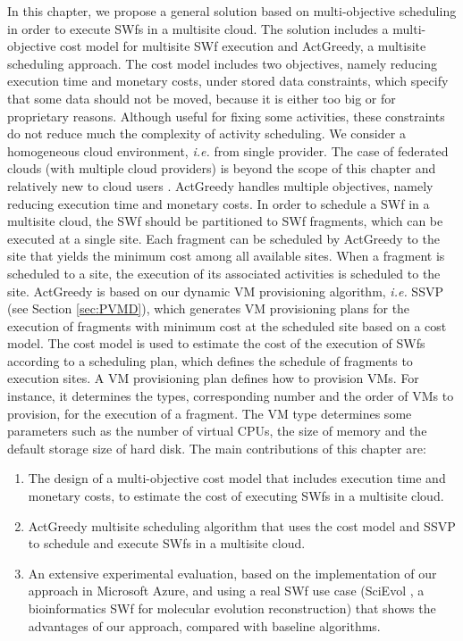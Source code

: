 In this chapter, we propose a general solution based on multi-objective scheduling in order to execute SWfs in a multisite cloud. The solution includes a multi-objective cost model for multisite SWf execution and ActGreedy, a multisite scheduling approach. 
The cost model includes two objectives, namely reducing execution time and monetary costs, under stored data constraints, which specify that some data should not be moved, because it is either too big or for proprietary reasons.
Although useful for fixing some activities, these constraints do not reduce much the complexity of activity scheduling.
We consider a homogeneous cloud environment, \textit{i.e.} from single provider. The case of federated clouds (with multiple cloud providers) is beyond the scope of this chapter and relatively new to cloud users \cite{Toosi2014}.
ActGreedy handles multiple objectives, namely reducing execution time and monetary costs. 
In order to schedule a SWf in a multisite cloud, the SWf should be partitioned to SWf fragments, which can be executed at a single site. Each fragment can be scheduled by ActGreedy to the site that yields the minimum cost among all available sites. When a fragment is scheduled to a site, the execution of its associated activities is scheduled to the site. 
ActGreedy is based on our dynamic VM provisioning algorithm, \textit{i.e.} SSVP (see Section \ref{sec:PVMD}), which generates VM provisioning plans for the execution of fragments with minimum cost at the scheduled site based on a cost model. The cost model is used to estimate the cost of the execution of SWfs \cite{Oliveira2012} according to a scheduling plan, which defines the schedule of fragments to execution sites. A VM provisioning plan defines how to provision VMs. For instance, it determines the types, corresponding number and the order of VMs to provision, for the execution of a fragment. The VM type determines some parameters such as the number of virtual CPUs, the size of memory and the default storage size of hard disk.
The main contributions of this chapter are:
\begin{enumerate}
\item The design of a multi-objective cost model that includes execution time and monetary costs, to estimate the cost of executing SWfs in a multisite cloud.
\item ActGreedy multisite scheduling algorithm that uses the cost model and SSVP to schedule and execute SWfs in a multisite cloud.
\item An extensive experimental evaluation, based on the implementation of our approach in Microsoft Azure, and using a real SWf use case (SciEvol \cite{Ocana2012}, a bioinformatics SWf for molecular evolution reconstruction) that shows the advantages of our approach, compared with baseline algorithms.
\end{enumerate}

